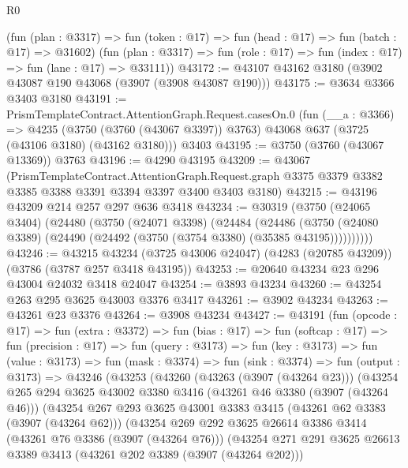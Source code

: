 \begin{lexlean}{R0}
\begin{coremodule}
      (fun (plan : @3317) => fun (token : @17) => fun (head : @17) => fun (batch : @17) => @31602)
      (fun (plan : @3317) => fun (role : @17) => fun (index : @17) => fun (lane : @17) => @33111))
@43172 := @43107 @43162 @3180 (@3902 @43087 @190 @43068 (@3907 (@3908 @43087 @190)))
@43175 := @3634 @3366 @3403 @3180
@43191 := PrismTemplateContract.AttentionGraph.Request.casesOn.{0}
    (fun (__a : @3366) =>
    @4235 (@3750 (@3760 (@43067 @3397)) @3763) @43068 @637 (@3725 (@43106 @3180) (@43162 @3180)))
    @3403
@43195 := @3750 (@3760 (@43067 @13369)) @3763
@43196 := @4290 @43195
@43209 := @43067
    (PrismTemplateContract.AttentionGraph.Request.graph
      @3375
      @3379
      @3382
      @3385
      @3388
      @3391
      @3394
      @3397
      @3400
      @3403
      @3180)
@43215 := @43196 @43209 @214 @257 @297 @636 @3418
@43234 := @30319
    (@3750
      (@24065 @3404)
      (@24480
        (@3750
          (@24071 @3398)
          (@24484
            (@24486
              (@3750 (@24080 @3389) (@24490 (@24492 (@3750 (@3754 @3380) (@35385 @43195))))))))))
@43246 := @43215
    @43234
    (@3725 @43006 @24047)
    (@4283 (@20785 @43209))
    (@3786 (@3787 @257 @3418 @43195))
@43253 := @20640 @43234 @23 @296 @43004 @24032 @3418 @24047
@43254 := @3893 @43234
@43260 := @43254 @263 @295 @3625 @43003 @3376 @3417
@43261 := @3902 @43234
@43263 := @43261 @23 @3376
@43264 := @3908 @43234
@43427 := @43191
    (fun (opcode : @17) =>
    fun (extra : @3372) =>
    fun (bias : @17) =>
    fun (softcap : @17) =>
    fun (precision : @17) =>
    fun (query : @3173) =>
    fun (key : @3173) =>
    fun (value : @3173) =>
    fun (mask : @3374) =>
    fun (sink : @3374) =>
    fun (output : @3173) =>
    @43246
      (@43253
        (@43260
          (@43263 (@3907 (@43264 @23)))
          (@43254
            @265
            @294
            @3625
            @43002
            @3380
            @3416
            (@43261 @46 @3380 (@3907 (@43264 @46)))
            (@43254
              @267
              @293
              @3625
              @43001
              @3383
              @3415
              (@43261 @62 @3383 (@3907 (@43264 @62)))
              (@43254
                @269
                @292
                @3625
                @26614
                @3386
                @3414
                (@43261 @76 @3386 (@3907 (@43264 @76)))
                (@43254
                  @271
                  @291
                  @3625
                  @26613
                  @3389
                  @3413
                  (@43261 @202 @3389 (@3907 (@43264 @202)))

\end{coremodule}
\end{lexlean}
